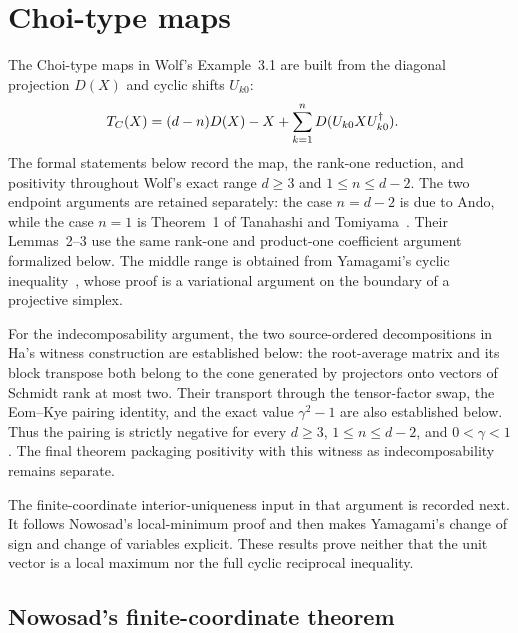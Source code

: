 \section{Choi-type maps}

The Choi-type maps in Wolf's Example~3.1 are built from the diagonal projection
$D(X)$ and cyclic shifts $U_{k0}$:
\begin{align}
    T_C(X)
     & =(d-n)D(X)-X+\sum_{k=1}^nD(U_{k0}XU_{k0}^{\dagger}).
    \notag
\end{align}
The formal statements below record the map, the rank-one reduction, and
positivity throughout Wolf's exact range $d\ge3$ and $1\le n\le d-2$.
The two endpoint arguments are retained separately: the case $n=d-2$ is due
to Ando, while the case $n=1$ is Theorem~1 of Tanahashi and
Tomiyama~\cite[pp.~309--311]{TanahashiTomiyama1988Indecomposable}. Their
Lemmas~2--3 use the same rank-one and product-one coefficient argument
formalized below. The middle range is obtained from Yamagami's cyclic
inequality~\cite{Yamagami1993Cyclic}, whose proof is a variational argument on
the boundary of a projective simplex.

For the indecomposability argument, the two source-ordered decompositions in
Ha's witness construction are established below: the root-average matrix and
its block transpose both belong to the cone generated by projectors onto
vectors of Schmidt rank at most two. Their transport through the tensor-factor
swap, the Eom--Kye pairing identity, and the exact value $\gamma^2-1$ are also
established below. Thus the pairing is strictly negative for every $d\ge3$,
$1\le n\le d-2$, and $0<\gamma<1$. The final theorem packaging positivity
with this witness as indecomposability remains separate.

The finite-coordinate interior-uniqueness input in that argument is recorded
next.  It follows Nowosad's local-minimum proof and then makes Yamagami's
change of sign and change of variables explicit.  These results prove neither
that the unit vector is a local maximum nor the full cyclic reciprocal
inequality.

\subsection{Nowosad's finite-coordinate theorem}

